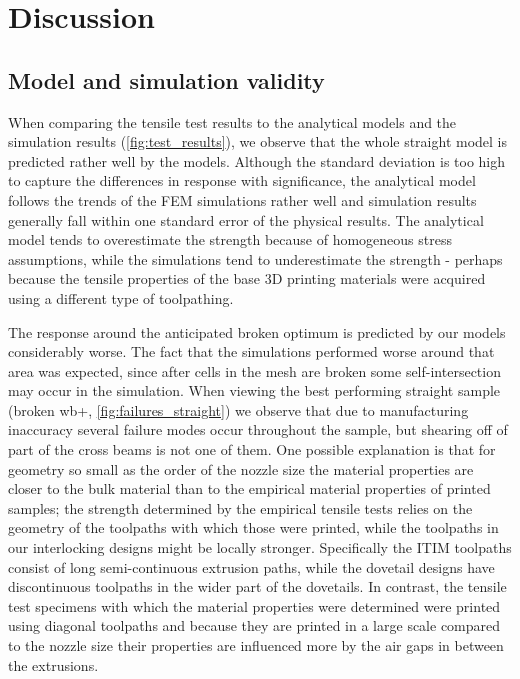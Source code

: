 \section{Discussion}
\subsection{Model and simulation validity}

When comparing the tensile test results to the analytical models and the simulation results (\cref{fig:test_results}),
we observe that the whole straight model is predicted rather well by the models.
Although the standard deviation is too high to capture the differences in response with significance,
the analytical model follows the trends of the FEM simulations rather well and simulation results generally fall within one standard error of the physical results.
The analytical model tends to overestimate the strength because of homogeneous stress assumptions,
while the simulations tend to underestimate the strength - perhaps because the tensile properties of the base 3D printing materials were acquired using a different type of toolpathing.

The response around the anticipated broken optimum is predicted by our models considerably worse.
The fact that the simulations performed worse around that area was expected, since after cells in the mesh are broken some self-intersection may occur in the simulation.
When viewing the best performing straight sample (broken wb+, \cref{fig:failures_straight}) we observe that due to manufacturing inaccuracy several failure modes occur throughout the sample,
but shearing off of part of the cross beams is not one of them.
One possible explanation is that for geometry so small as the order of the nozzle size the material properties are closer to the bulk material than to the empirical material properties of printed samples;
the strength determined by the empirical tensile tests relies on the geometry of the toolpaths with which those were printed, while the toolpaths in our interlocking designs might be locally stronger.
Specifically the ITIM toolpaths consist of long semi-continuous extrusion paths, while the dovetail designs have discontinuous toolpaths in the wider part of the dovetails.
In contrast, the tensile test specimens with which the material properties were determined were printed using diagonal toolpaths
and because they are printed in a large scale compared to the nozzle size their properties are influenced more by the air gaps in between the extrusions.

